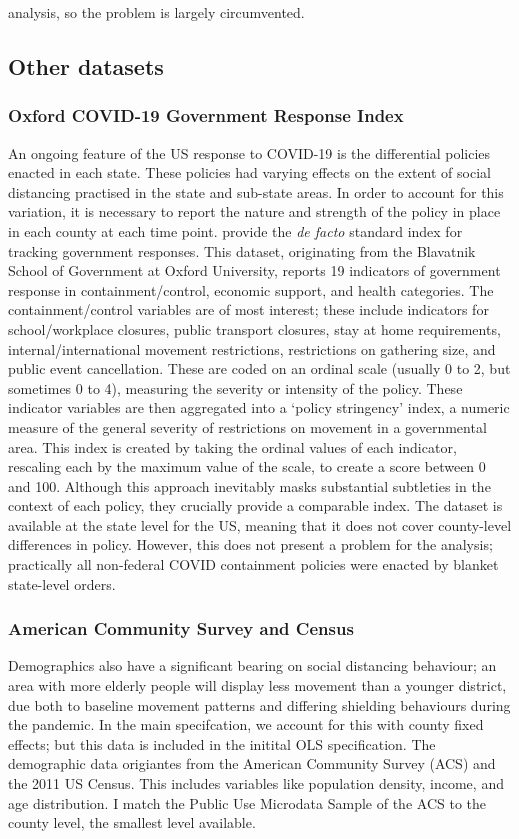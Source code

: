 \documentclass[12pt,a4]{article}
\begin{document}
analysis, so the problem is largely circumvented.

\subsection{Other datasets}
\subsubsection{Oxford COVID-19 Government Response Index}
An ongoing feature of the US response to COVID-19 is the differential policies enacted in each state. These policies had varying effects on the extent of social distancing practised in the state and sub-state areas. In order to account for this variation, it is necessary to report the nature and strength of the policy in place in each county at each time point. \textcite{petherickVariationGovernmentResponses2020} provide the \textit{de facto} standard index for tracking government responses. This dataset, originating from the Blavatnik School of Government at Oxford University, reports 19 indicators of government response in containment/control, economic support, and health categories. The containment/control variables are of most interest; these include indicators for school/workplace closures, public transport closures, stay at home requirements, internal/international movement restrictions, restrictions on gathering size, and public event cancellation. These are coded on an ordinal scale (usually 0 to 2, but sometimes 0 to 4), measuring the severity or intensity of the policy. These indicator variables are then aggregated into a `policy stringency' index, a numeric measure of the general severity of restrictions on movement in a governmental area. This index is created by taking the ordinal values of each indicator, rescaling each by the maximum value of the scale, to create a score between 0 and 100. Although this approach inevitably masks substantial subtleties in the context of each policy, they crucially provide a comparable index. The dataset is available at the state level for the US, meaning that it does not cover county-level differences in policy. However, this does not present a problem for the analysis; practically all non-federal COVID containment policies were enacted by blanket state-level orders.

\subsubsection{American Community Survey and Census}
Demographics also have a significant bearing on social distancing behaviour; an area with more elderly people will display less movement than a younger district, due both to baseline movement patterns and differing shielding behaviours during the pandemic. In the main specifcation, we account for this with county fixed effects; but this data is included in the initital OLS specification. The demographic data origiantes from the American Community Survey (ACS) and the 2011 US Census. This includes variables like population density, income, and age distribution. I match the Public Use Microdata Sample of the ACS to the county level, the smallest level available. 
\end{document}
